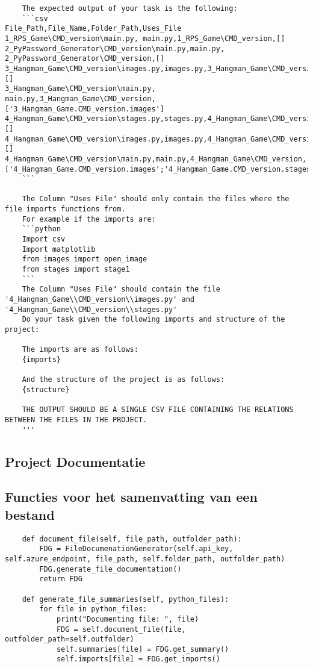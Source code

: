 \begin{verbatim}
    The expected output of your task is the following:
    ```csv
File_Path,File_Name,Folder_Path,Uses_File
1_RPS_Game\CMD_version\main.py, main.py,1_RPS_Game\CMD_version,[]
2_PyPassword_Generator\CMD_version\main.py,main.py, 2_PyPassword_Generator\CMD_version,[]
3_Hangman_Game\CMD_version\images.py,images.py,3_Hangman_Game\CMD_version,[]
3_Hangman_Game\CMD_version\main.py, main.py,3_Hangman_Game\CMD_version,['3_Hangman_Game.CMD_version.images']
4_Hangman_Game\CMD_version\stages.py,stages.py,4_Hangman_Game\CMD_version,[]
4_Hangman_Game\CMD_version\images.py,images.py,4_Hangman_Game\CMD_version,[]
4_Hangman_Game\CMD_version\main.py,main.py,4_Hangman_Game\CMD_version,['4_Hangman_Game.CMD_version.images';'4_Hangman_Game.CMD_version.stages']
    ```

    The Column "Uses File" should only contain the files where the file imports functions from.
    For example if the imports are:
    ```python
    Import csv
    Import matplotlib
    from images import open_image
    from stages import stage1
    ```
    The Column "Uses File" should contain the file '4_Hangman_Game\\CMD_version\\images.py' and '4_Hangman_Game\\CMD_version\\stages.py'
    Do your task given the following imports and structure of the project:
    
    The imports are as follows:
    {imports}

    And the structure of the project is as follows:
    {structure}

    THE OUTPUT SHOULD BE A SINGLE CSV FILE CONTAINING THE RELATIONS BETWEEN THE FILES IN THE PROJECT.
    '''
\end{verbatim}

\subsection{Project Documentatie}

\subsection{Functies voor het samenvatting van een bestand}
\label{bijlage:file-summary-functions}
\begin{verbatim}
    def document_file(self, file_path, outfolder_path):
        FDG = FileDocumenationGenerator(self.api_key, self.azure_endpoint, file_path, self.folder_path, outfolder_path)
        FDG.generate_file_documentation()
        return FDG

    def generate_file_summaries(self, python_files):
        for file in python_files:
            print("Documenting file: ", file)
            FDG = self.document_file(file, outfolder_path=self.outfolder)
            self.summaries[file] = FDG.get_summary()
            self.imports[file] = FDG.get_imports()
\end{verbatim}

